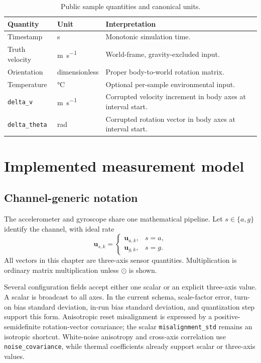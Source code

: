 \documentclass[11pt,oneside,headings=big]{scrreprt}
\newcommand{\Had}{\odot}
\newcommand{\vect}[1]{\bm{#1}}
\newcommand{\field}[1]{\texttt{#1}}
\begin{document}
    \begin{table}[htbp]
        \centering
        \caption{Public sample quantities and canonical units.}
        \label{tab:public-units}
        \begin{tabularx}{\textwidth}{@{}L{1.9in}L{1.7in}Y@{}}
\toprule
\textbf{Quantity} & \textbf{Unit} & \textbf{Interpretation} \\
\midrule
Timestamp & \si{\second} & Monotonic simulation time. \\
Truth velocity & \si{\meter\per\second} & World-frame, gravity-excluded input. \\
Orientation & dimensionless & Proper body-to-world rotation matrix. \\
Temperature & \si{\degreeCelsius} & Optional per-sample environmental input. \\
\field{delta\_v} & \si{\meter\per\second} & Corrupted velocity increment in body axes at interval start. \\
\field{delta\_theta} & \si{\radian} & Corrupted rotation vector in body axes at interval start. \\
\bottomrule
        \end{tabularx}
    \end{table}


    \chapter{Implemented measurement model}
    \label{chap:measurement}


    \section{Channel-generic notation}
    The accelerometer and gyroscope share one mathematical pipeline. Let
    \(s\in\{a,g\}\) identify the channel, with ideal rate
    \begin{equation}
        \vect u_{s,k}=\begin{cases}
                          \vect u_{a,k},&s=a,\\
                          \vect u_{g,k},&s=g.
        \end{cases}
    \end{equation}
    All vectors in this chapter are three-axis sensor quantities. Multiplication is
    ordinary matrix multiplication unless \(\Had\) is shown.

    Several configuration fields accept either one scalar or an explicit three-axis
    value. A scalar is broadcast to all axes. In the current schema, scale-factor
    error, turn-on bias standard deviation, in-run bias standard deviation, and
    quantization step support this form. Anisotropic reset misalignment is expressed
    by a positive-semidefinite rotation-vector covariance; the scalar
    \field{misalignment\_std} remains an isotropic shortcut. White-noise
    anisotropy and cross-axis correlation use \field{noise\_covariance}, while
    thermal coefficients already support scalar or three-axis values.
\end{document}
